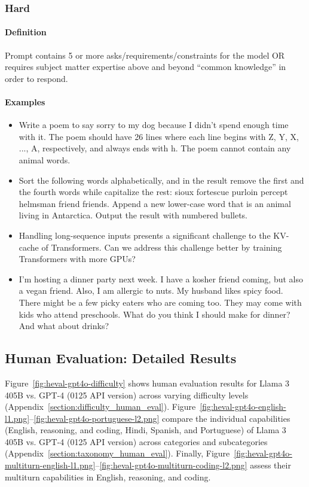 \subsubsection{Hard}

\paragraph{Definition} Prompt contains 5 or more asks/requirements/constraints for the model OR requires subject matter expertise above and beyond “common knowledge” in order to respond.

\paragraph{Examples}

\begin{itemize}
    \item Write a poem to say sorry to my dog because I didn't spend enough time with it. The poem should have 26 lines where each line begins with Z, Y, X, ..., A, respectively, and always ends with h. The poem cannot contain any animal words.
    \item Sort the following words alphabetically, and in the result remove the first and the fourth words while capitalize the rest: sioux fortescue purloin percept helmsman friend friends. Append a new lower-case word that is an animal living in Antarctica. Output the result with numbered bullets.
    \item Handling long-sequence inputs presents a significant challenge to the KV-cache of Transformers.  Can we address this challenge better by training Transformers with more GPUs?
    \item I’m hosting a dinner party next week. I have a kosher friend coming, but also a vegan friend. Also, I am allergic to nuts. My husband likes spicy food. There might be a few picky eaters who are coming too. They may come with kids who attend preschools. What do you think I should make for dinner? And what about drinks?
\end{itemize}


\subsection{Human Evaluation: Detailed Results}
\label{section:detailed_human_eval}

Figure~\ref{fig:heval-gpt4o-difficulty} shows human evaluation results for Llama 3 405B vs. GPT-4 (0125 API version) across varying difficulty levels (Appendix~\ref{section:difficulty_human_eval}). Figure~\ref{fig:heval-gpt4o-english-l1.png}--\ref{fig:heval-gpt4o-portuguese-l2.png}  compare the individual capabilities (English, reasoning, and coding, Hindi, Spanish, and Portuguese) of Llama 3 405B vs. GPT-4 (0125 API version) across categories and subcategories (Appendix~\ref{section:taxonomy_human_eval}).
Finally, Figure~\ref{fig:heval-gpt4o-multiturn-english-l1.png}--\ref{fig:heval-gpt4o-multiturn-coding-l2.png} assess their multiturn capabilities in English, reasoning, and coding.







